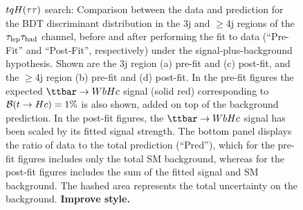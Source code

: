 \begin{figure}[htbp]
\begin{center}
\caption{\small{$tqH(\tau\tau)$ search: Comparison between the data and prediction for the BDT discriminant distribution in the 3j and $\geq$4j regions of 
the $\tau_{\mathrm{lep}} \tau_{\mathrm{had}}$ channel, before and after performing the fit to data  (``Pre-Fit'' and ``Post-Fit'', respectively) under the signal-plus-background hypothesis.
Shown are the 3j region (a) pre-fit and (c) post-fit, and the $\geq$4j region (b) pre-fit and (d) post-fit.
In the pre-fit figures the expected $\Hc$ signal (solid red) corresponding to $\mathcal{B}(t\to Hc)=1\%$ is also shown,
added on top of the background prediction. In the post-fit figures, the $\Hc$ signal has been scaled by its fitted signal strength.
The bottom panel displays the ratio of data to the total prediction (``Pred''), which for the pre-fit figures includes only the total SM background,
whereas for the post-fit figures includes the sum of the fitted signal and SM background.
The hashed area represents the total uncertainty on the background. \textbf{Improve style.}}}
\label{fig:prepostfit_unblinded_WbHc_lh}
\end{center}
\end{figure}

